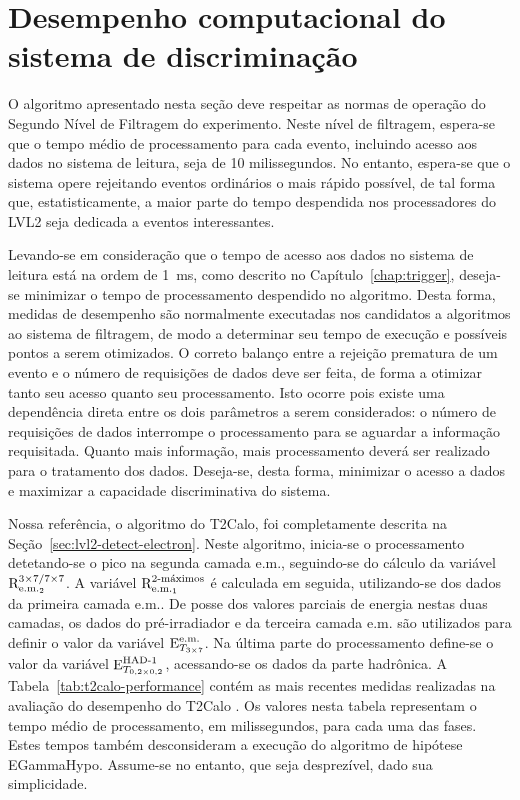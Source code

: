 \typeout{ ====================================================================}
\typeout{ ====================================================================}

\chapter{Desempenho computacional do sistema de discriminação}
\label{chap:implement}

O algoritmo apresentado nesta seção deve respeitar as normas de operação do
Segundo Nível de Filtragem do experimento. Neste nível de filtragem, espera-se
que o tempo médio de processamento para cada evento, incluindo acesso aos
dados no sistema de leitura, seja de 10 milissegundos. No entanto, espera-se
que o sistema opere rejeitando eventos ordinários o mais rápido possível, de
tal forma que, estatisticamente, a maior parte do tempo despendida nos
processadores do LVL2 seja dedicada a eventos interessantes.

Levando-se em consideração que o tempo de acesso aos dados no sistema de
leitura está na ordem de 1~ms, como descrito no Capítulo~\ref{chap:trigger},
deseja-se minimizar o tempo de processamento despendido no algoritmo. Desta
forma, medidas de desempenho são normalmente executadas nos candidatos a
algoritmos ao sistema de filtragem, de modo a determinar seu tempo de execução
e possíveis pontos a serem otimizados. O correto balanço entre a rejeição
prematura de um evento e o número de requisições de dados deve ser feita, de
forma a otimizar tanto seu acesso quanto seu processamento. Isto ocorre pois
existe uma dependência direta entre os dois parâmetros a serem considerados: o
número de requisições de dados interrompe o processamento para se aguardar a
informação requisitada. Quanto mais informação, mais processamento deverá ser
realizado para o tratamento dos dados. Deseja-se, desta forma, minimizar o
acesso a dados e maximizar a capacidade discriminativa do sistema.

Nossa referência, o algoritmo do T2Calo, foi completamente descrita na
Seção~\ref{sec:lvl2-detect-electron}. Neste algoritmo, inicia-se o
processamento detetando-se o pico na segunda camada e.m., seguindo-se do
cálculo da variável $\rcore$. A variável $\eratio$ é calculada em seguida,
utilizando-se dos dados da primeira camada e.m.. De posse dos valores parciais
de energia nestas duas camadas, os dados do pré-irradiador e da terceira
camada e.m. são utilizados para definir o valor da variável $\etem$. Na última
parte do processamento define-se o valor da variável $\ethad$, acessando-se os
dados da parte hadrônica. A Tabela~\ref{tab:t2calo-performance} contém as mais
recentes medidas realizadas na avaliação do desempenho do T2Calo
\cite{denis-presentation}. Os valores nesta tabela representam o tempo médio
de processamento, em milissegundos, para cada uma das fases. Estes tempos
também desconsideram a execução do algoritmo de hipótese EGammaHypo. Assume-se
no entanto, que seja desprezível, dado sua simplicidade.

